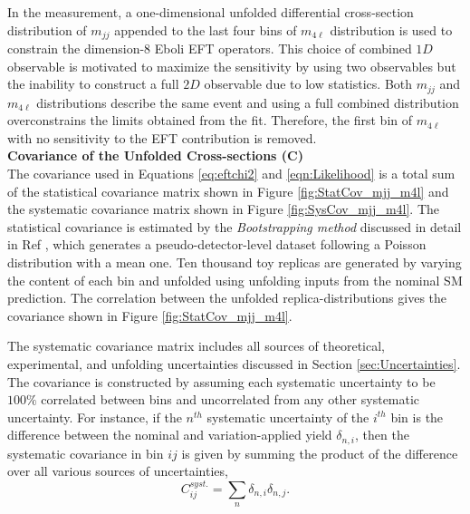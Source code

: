 In the measurement, a one-dimensional unfolded differential cross-section distribution of $m_{jj}$ appended to the last four bins of $m_{4\ell}$ distribution is used to constrain the dimension-8 Eboli EFT operators. This choice of combined $1D$ observable is motivated to maximize the sensitivity by using two observables but the inability to construct a full $2D$ observable due to low statistics. Both $m_{jj}$ and $m_{4\ell}$ distributions describe the same event and using a full combined distribution overconstrains the limits obtained from the fit. Therefore, the first bin of $m_{4\ell}$ with no sensitivity to the EFT contribution is removed. \\
\textbf{Covariance of the Unfolded Cross-sections (C)}\\
The covariance used in Equations \ref{eq:eftchi2} and \ref{eqn:Likelihood} is a total sum of the statistical covariance matrix shown in Figure \ref{fig:StatCov_mjj_m4l} and the systematic covariance matrix shown in Figure \ref{fig:SysCov_mjj_m4l}. The statistical covariance is estimated by the \textit{Bootstrapping method} discussed in detail in Ref \cite{Bootstrapping}, which generates a pseudo-detector-level dataset following a Poisson distribution with a mean one. Ten thousand toy replicas are generated by varying the content of each bin and unfolded using unfolding inputs from the nominal SM prediction. The correlation between the unfolded replica-distributions gives the covariance shown in Figure \ref{fig:StatCov_mjj_m4l}.

The systematic covariance matrix includes all sources of theoretical, experimental, and unfolding uncertainties discussed in Section \ref{sec:Uncertainties}. The covariance is constructed by assuming each systematic uncertainty to be $100\%$ correlated between bins and uncorrelated from any other systematic uncertainty. For instance, if the $n^{th}$ systematic uncertainty of the $i^{th}$ bin is the difference between the nominal and variation-applied yield $\delta_{n, i}$, then the systematic covariance in bin $ij$ is given by summing the product of the difference over all various sources of uncertainties,
\begin{equation}
C^{syst.}_{ij} = \sum_{n}\delta_{n, i}\delta_{n, j}.
\end{equation} 

